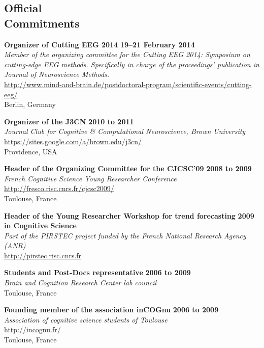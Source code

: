 \documentclass[margin,line]{resume}
\begin{document}
\begin{resume}
	\vspace{3mm}
    \section{\mysidestyle Official\\ Commitments} %
	
	\textbf{Organizer of Cutting EEG 2014} \hfill \textbf{19–21 February 2014}\\
	\textsl{Member of the organizing committee for the Cutting EEG 2014: Symposium on cutting-edge EEG methods. Specifically in charge of the proceedings' publication in Journal of Neuroscience Methods.}\\
	 \url{http://www.mind-and-brain.de/postdoctoral-program/scientific-events/cutting-eeg/}\\
	Berlin, Germany
	
	\textbf{Organizer of the J3CN} \hfill \textbf{2010 to 2011}\\
	\textsl{Journal Club for Cognitive \& Computational Neuroscience, Brown University}\\
	 \url{https://sites.google.com/a/brown.edu/j3cn/}\\
	Providence, USA	

	\textbf{Header of the Organizing Committee for the CJCSC'09} \hfill \textbf{2008 to 2009}\\
	\textsl{French Cognitive Science Young Researcher Conference}\\
	 \url{http://fresco.risc.cnrs.fr/cjcsc2009/}\\
	Toulouse, France		

	\textbf{Header of the Young Researcher Workshop for trend forecasting} \hfill \textbf{2009}\\
	 \textbf{in Cognitive Science}\\
	\textsl{Part of the PIRSTEC project funded by the French National Research Agency (ANR)}\\
	 \url{http://pirstec.risc.cnrs.fr}
	 
	 	\newpage

	\textbf{Students and Post-Docs representative} \hfill \textbf{2006 to 2009}\\
	\textsl{Brain and Cognition Research Center lab council}\\
	Toulouse, France	

	\textbf{Founding member of the association inCOGnu} \hfill \textbf{2006 to 2009}\\
	\textsl{Association of cognitive science students of Toulouse}\\
	 \url{http://incognu.fr/}\\
	Toulouse, France



\end{resume}
\end{document}
